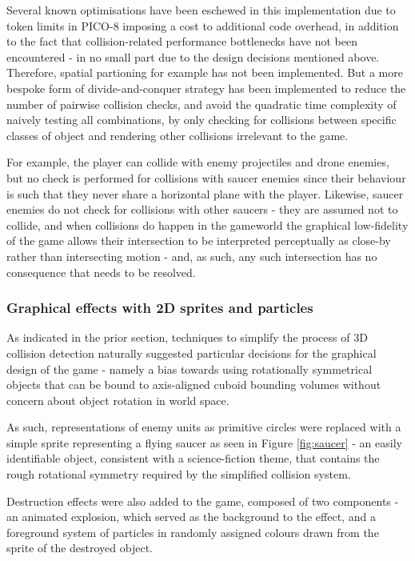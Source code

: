 \documentclass[11pt]{article}
\begin{document}
Several known optimisations have been eschewed in this implementation due to token limits in PICO-8
imposing a cost to additional code overhead, in addition to the fact that collision-related performance
bottlenecks have not been encountered - in no small part due to the design decisions mentioned above.
Therefore, spatial partioning for example has not been implemented. But a more bespoke form of divide-and-conquer
strategy has been implemented to reduce the number of pairwise collision checks, and avoid the quadratic
time complexity of naively testing all combinations, by only checking for collisions between specific
classes of object and rendering other collisions irrelevant to the game.

For example, the player can collide with enemy projectiles and drone enemies, but no check is performed
for collisions with saucer enemies since their behaviour is such that they never share a horizontal
plane with the player. Likewise, saucer enemies do not check for collisions with other saucers - they are 
assumed not to collide, and when collisions do happen in the gameworld the graphical low-fidelity of the
game allows their intersection to be interpreted perceptually as close-by rather than intersecting motion -
and, as such, any such intersection has no consequence that needs to be resolved.

\subsubsection*{Graphical effects with 2D sprites and particles}

As indicated in the prior section, techniques to simplify the process of 3D collision detection naturally
suggested particular decisions for the graphical design of the game - namely a bias towards using rotationally
symmetrical objects that can be bound to axis-aligned cuboid bounding volumes without concern about object
rotation in world space.

As such, representations of enemy units as primitive circles were replaced with a simple sprite representing
a flying saucer as seen in Figure \ref{fig:saucer} - an easily identifiable object, consistent with a science-fiction theme, that contains the
rough rotational symmetry required by the simplified collision system.

Destruction effects were also added to the game, composed of two components - an animated explosion, which
served as the background to the effect, and a foreground system of particles in randomly assigned colours
drawn from the sprite of the destroyed object.
\end{document}
